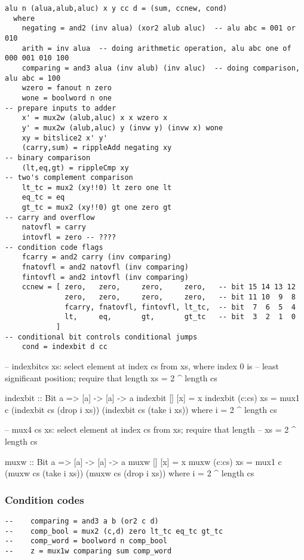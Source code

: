 \documentclass[11pt]{article}
\begin{document}
\begin{verbatim}
alu n (alua,alub,aluc) x y cc d = (sum, ccnew, cond)
  where
    negating = and2 (inv alua) (xor2 alub aluc)  -- alu abc = 001 or 010
    arith = inv alua  -- doing arithmetic operation, alu abc one of 000 001 010 100
    comparing = and3 alua (inv alub) (inv aluc)  -- doing comparison, alu abc = 100
    wzero = fanout n zero
    wone = boolword n one
-- prepare inputs to adder    
    x' = mux2w (alub,aluc) x x wzero x
    y' = mux2w (alub,aluc) y (invw y) (invw x) wone
    xy = bitslice2 x' y'
    (carry,sum) = rippleAdd negating xy
-- binary comparison    
    (lt,eq,gt) = rippleCmp xy
-- two's complement comparison    
    lt_tc = mux2 (xy!!0) lt zero one lt
    eq_tc = eq
    gt_tc = mux2 (xy!!0) gt one zero gt
-- carry and overflow
    natovfl = carry
    intovfl = zero -- ????
-- condition code flags
    fcarry = and2 carry (inv comparing)
    fnatovfl = and2 natovfl (inv comparing)
    fintovfl = and2 intovfl (inv comparing)
    ccnew = [ zero,   zero,     zero,     zero,   -- bit 15 14 13 12
              zero,   zero,     zero,     zero,   -- bit 11 10  9  8
              fcarry, fnatovfl, fintovfl, lt_tc,  -- bit  7  6  5  4
              lt,     eq,       gt,       gt_tc   -- bit  3  2  1  0
            ]
-- conditional bit controls conditional jumps            
    cond = indexbit d cc
\end{verbatim}

-- indexbitcs xs: select element at index cs from xs, where index 0 is
-- least significant position; require that length xs = 2 \^{} length cs

indexbit :: Bit a => [a] -> [a] -> a
indexbit [] [x] = x
indexbit (c:cs) xs =
  mux1 c (indexbit cs (drop i xs))
         (indexbit cs (take i xs))
  where i = 2 \^{} length cs

-- mux4 cs xs: select element at index cs from xs; require that length
-- xs = 2 \^{} length cs

muxw :: Bit a => [a] -> [a] -> a
muxw [] [x] = x
muxw (c:cs) xs =
  mux1 c (muxw cs (take i xs))
         (muxw cs (drop i xs))
  where i = 2 \^{} length cs


\subsubsection{Condition codes}
\label{sec:org6c98e44}


\begin{verbatim}
--    comparing = and3 a b (or2 c d)
--    comp_bool = mux2 (c,d) zero lt_tc eq_tc gt_tc
--    comp_word = boolword n comp_bool
--    z = mux1w comparing sum comp_word
\end{verbatim}
\end{document}
